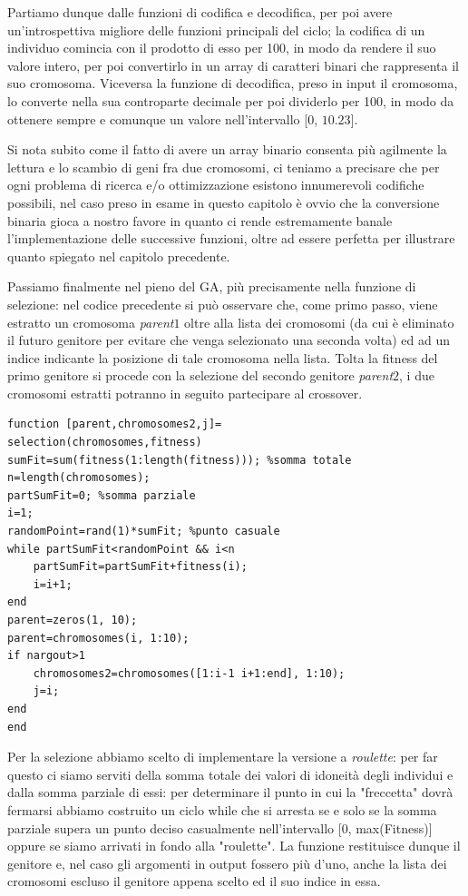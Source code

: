 Partiamo dunque dalle funzioni di codifica e decodifica, per poi avere un'introspettiva migliore delle funzioni principali del ciclo; la codifica di un individuo comincia con il prodotto di esso per 100, in modo da rendere il suo valore intero, per poi convertirlo in un array di caratteri binari che rappresenta il suo cromosoma.
Viceversa la funzione di decodifica, preso in input il cromosoma, lo converte nella sua controparte decimale per poi dividerlo per 100, in modo da ottenere sempre e comunque un valore nell'intervallo [$0$, $10.23$].

Si nota subito come il fatto di avere un array binario consenta pi\`u agilmente la lettura e lo scambio di geni fra due cromosomi, ci teniamo a precisare che per ogni problema di ricerca e/o ottimizzazione esistono innumerevoli codifiche possibili, nel caso preso in esame in questo capitolo \`e ovvio che la conversione binaria gioca a nostro favore in quanto ci rende estremamente banale l'implementazione delle successive funzioni, oltre ad essere perfetta per illustrare quanto spiegato nel capitolo precedente.
\vspace{3mm}

Passiamo finalmente nel pieno del GA, pi\`u precisamente nella funzione di selezione: nel codice precedente si pu\`o osservare che, come primo passo, viene estratto un cromosoma \textit{parent$1$} oltre alla lista dei cromosomi (da cui \`e eliminato il futuro genitore per evitare che venga selezionato una seconda volta) ed ad un indice indicante la posizione di tale cromosoma nella lista. Tolta la fitness del primo genitore si procede con la selezione del secondo genitore \textit{parent$2$}, i due cromosomi estratti potranno in seguito partecipare al crossover.
\begin{lstlisting}[style=matlab, style=matlab2, style=matlab3]
function [parent,chromosomes2,j]=
selection(chromosomes,fitness)
sumFit=sum(fitness(1:length(fitness))); %somma totale
n=length(chromosomes);
partSumFit=0; %somma parziale
i=1;
randomPoint=rand(1)*sumFit; %punto casuale
while partSumFit<randomPoint && i<n
    partSumFit=partSumFit+fitness(i);
    i=i+1;
end
parent=zeros(1, 10);
parent=chromosomes(i, 1:10);
if nargout>1
    chromosomes2=chromosomes([1:i-1 i+1:end], 1:10);
    j=i;
end
end
\end{lstlisting}
Per la selezione abbiamo scelto di implementare la versione a \textit{roulette}: per far questo ci siamo serviti della somma totale dei valori di idoneit\`a degli individui e dalla somma parziale di essi: per determinare il punto in cui la "freccetta" dovr\`a fermarsi abbiamo costruito un ciclo while che si arresta se e solo se la somma parziale supera un punto deciso casualmente nell'intervallo [$0$, max(Fitness)] oppure se siamo arrivati in fondo alla "roulette". La funzione restituisce dunque il genitore e, nel caso gli argomenti in output fossero pi\`u d'uno, anche la lista dei cromosomi escluso il genitore appena scelto ed il suo indice in essa.
\vspace{3mm}

